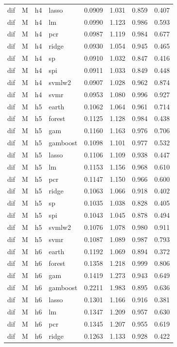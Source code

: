 \begin{ThreePartTable}
\begin{longtable}[t]{llclcccc}
dif & M & h4 & lasso & 0.0909 & 1.031 & 0.859 & 0.407\\
dif & M & h4 & lm & 0.0990 & 1.123 & 0.986 & 0.593\\
dif & M & h4 & pcr & 0.0987 & 1.119 & 0.984 & 0.677\\
dif & M & h4 & ridge & 0.0930 & 1.054 & 0.945 & 0.465\\
dif & M & h4 & sp & 0.0910 & 1.032 & 0.847 & 0.416\\
dif & M & h4 & spi & 0.0911 & 1.033 & 0.849 & 0.448\\
dif & M & h4 & svmlw2 & 0.0907 & 1.028 & 0.962 & 0.874\\
dif & M & h4 & svmr & 0.0953 & 1.080 & 0.996 & 0.927\\
\addlinespace
dif & M & h5 & earth & 0.1062 & 1.064 & 0.961 & 0.714\\
dif & M & h5 & forest & 0.1125 & 1.128 & 0.984 & 0.438\\
dif & M & h5 & gam & 0.1160 & 1.163 & 0.976 & 0.706\\
dif & M & h5 & gamboost & 0.1098 & 1.101 & 0.977 & 0.532\\
dif & M & h5 & lasso & 0.1106 & 1.109 & 0.938 & 0.447\\
dif & M & h5 & lm & 0.1153 & 1.156 & 0.968 & 0.610\\
dif & M & h5 & pcr & 0.1147 & 1.150 & 0.966 & 0.600\\
dif & M & h5 & ridge & 0.1063 & 1.066 & 0.918 & 0.402\\
dif & M & h5 & sp & 0.1035 & 1.038 & 0.828 & 0.405\\
dif & M & h5 & spi & 0.1043 & 1.045 & 0.878 & 0.494\\
dif & M & h5 & svmlw2 & 0.1076 & 1.078 & 0.980 & 0.911\\
dif & M & h5 & svmr & 0.1087 & 1.089 & 0.987 & 0.793\\
\addlinespace
dif & M & h6 & earth & 0.1192 & 1.069 & 0.894 & 0.372\\
dif & M & h6 & forest & 0.1358 & 1.218 & 0.999 & 0.806\\
dif & M & h6 & gam & 0.1419 & 1.273 & 0.943 & 0.649\\
dif & M & h6 & gamboost & 0.2211 & 1.983 & 0.895 & 0.636\\
dif & M & h6 & lasso & 0.1301 & 1.166 & 0.916 & 0.381\\
dif & M & h6 & lm & 0.1347 & 1.209 & 0.957 & 0.630\\
dif & M & h6 & pcr & 0.1345 & 1.207 & 0.955 & 0.619\\
dif & M & h6 & ridge & 0.1263 & 1.133 & 0.928 & 0.422\\

\end{longtable}
\end{ThreePartTable}
